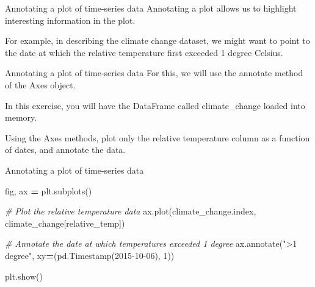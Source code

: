 \documentclass[
  ignorenonframetext,
]{beamer}
\newenvironment{Shaded}{\begin{snugshade}}{\end{snugshade}}
\newcommand{\CommentTok}[1]{\textcolor[rgb]{0.56,0.35,0.01}{\textit{#1}}}
\newcommand{\DecValTok}[1]{\textcolor[rgb]{0.00,0.00,0.81}{#1}}
\newcommand{\NormalTok}[1]{#1}
\newcommand{\OperatorTok}[1]{\textcolor[rgb]{0.81,0.36,0.00}{\textbf{#1}}}
\newcommand{\StringTok}[1]{\textcolor[rgb]{0.31,0.60,0.02}{#1}}
\begin{document}
\begin{frame}{Annotating a plot of time-series data}
\label{annotating-a-plot-of-time-series-data}
Annotating a plot allows us to highlight interesting information in the
plot.

For example, in describing the climate change dataset, we might want to
point to the date at which the relative temperature first exceeded 1
degree Celsius.
\end{frame}

\begin{frame}{Annotating a plot of time-series data}
\label{annotating-a-plot-of-time-series-data-1}
For this, we will use the annotate method of the Axes object.

In this exercise, you will have the DataFrame called climate\_change
loaded into memory.

Using the Axes methods, plot only the relative temperature column as a
function of dates, and annotate the data.
\end{frame}

\begin{frame}[fragile]{Annotating a plot of time-series data}
\label{annotating-a-plot-of-time-series-data-2}

\begin{Shaded}
\begin{Highlighting}[]
\NormalTok{fig, ax }\OperatorTok{=}\NormalTok{ plt.subplots()}

\CommentTok{\# Plot the relative temperature data}
\NormalTok{ax.plot(climate\_change.index, climate\_change[}\StringTok{\textquotesingle{}relative\_temp\textquotesingle{}}\NormalTok{])}

\CommentTok{\# Annotate the date at which temperatures exceeded 1 degree}
\NormalTok{ax.annotate(}\StringTok{"\textgreater{}1 degree"}\NormalTok{, xy}\OperatorTok{=}\NormalTok{(pd.Timestamp(}\StringTok{\textquotesingle{}2015{-}10{-}06\textquotesingle{}}\NormalTok{), }\DecValTok{1}\NormalTok{))}

\NormalTok{plt.show()}
\end{Highlighting}
\end{Shaded}
\end{frame}
\end{document}
